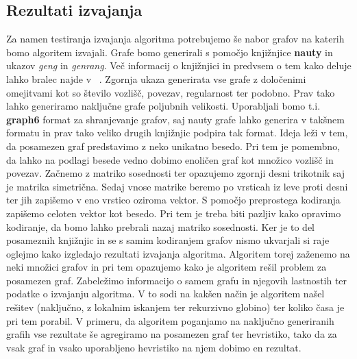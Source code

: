 \documentclass[12pt,a4paper,twoside]{article}
\theoremstyle{definition} %
\theoremstyle{plain} %
\numberwithin{equation}{section}  %
\begin{document}
\subsection{Rezultati izvajanja}
 Za namen testiranja izvajanja algoritma potrebujemo še nabor grafov na katerih bomo algoritem izvajali. Grafe bomo generirali s pomočjo knjižnjice \textbf{nauty} in ukazov \textit{geng} in \textit{genrang}. Več informacij o knjižnjici in predvsem o tem kako deluje lahko bralec najde v ~\citet{nauty}. Zgornja ukaza generirata vse grafe z določenimi omejitvami kot so število vozlišč, povezav, regularnost ter podobno. Prav tako lahko generiramo naključne grafe poljubnih velikosti. Uporabljali bomo t.i. \textbf{graph6} format za shranjevanje grafov, saj nauty grafe lahko generira v takšnem formatu in prav tako veliko drugih knjižnjic podpira tak format. Ideja leži v tem, da posamezen graf predstavimo z neko unikatno besedo. Pri tem je pomembno, da lahko na podlagi besede vedno dobimo enoličen graf kot množico vozlišč in povezav. Začnemo z matriko sosednosti ter opazujemo zgornji desni trikotnik saj je matrika simetrična. Sedaj vnose matrike beremo po vrsticah iz leve proti desni ter jih zapišemo v eno vrstico oziroma vektor. S pomočjo preprostega kodiranja zapišemo celoten vektor kot besedo. Pri tem je treba biti pazljiv kako opravimo kodiranje, da bomo lahko prebrali nazaj matriko sosednosti. Ker je to del posameznih knjižnjic in se s samim kodiranjem grafov nismo ukvarjali si raje oglejmo kako izgledajo rezultati izvajanja algoritma. Algoritem torej zaženemo na neki množici grafov in pri tem opazujemo kako je algoritem rešil problem za posamezen graf. Zabeležimo informacijo o samem grafu in njegovih lastnostih ter podatke o izvajanju algoritma. V to sodi na kakšen način je algoritem našel rešitev (naključno, z lokalnim iskanjem ter rekurzivno globino) ter koliko časa je pri tem porabil. V primeru, da algoritem poganjamo na naključno generiranih grafih vse rezultate še agregiramo na posamezen graf ter hevristiko, tako da za vsak graf in vsako uporabljeno hevristiko na njem dobimo en rezultat.
\end{document}
